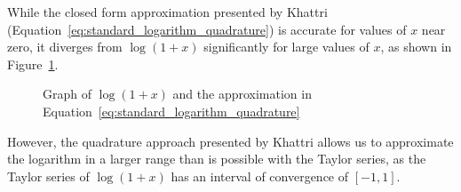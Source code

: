 While the closed form approximation presented by Khattri (Equation~\ref{eq:standard_logarithm_quadrature}) is accurate for values of $x$ near zero, it diverges from $\log{(1+x)}$ significantly for large values of $x$, as shown in Figure~\ref{fig:standard_logarithm_quadrature}.
\begin{figure}[!ht]
	\centering
	\caption{Graph of $\log{(1+x)}$ and the approximation in Equation~\ref{eq:standard_logarithm_quadrature}}
	\label{fig:standard_logarithm_quadrature}
\end{figure}

However, the quadrature approach presented by Khattri allows us to approximate the logarithm in a larger range than is possible with the Taylor series, as the Taylor series of $\log(1+x)$ has an interval of convergence of $[-1,1]$.
